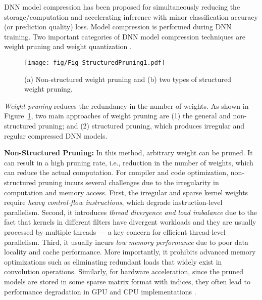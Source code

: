 \documentclass[sigplan,screen]{acmart}
\begin{document}
DNN model compression has been proposed for simultaneously reducing the storage/computation and accelerating inference with minor classification accuracy (or prediction quality) loss. Model compression is performed during DNN training. Two important categories of DNN model compression techniques are weight pruning \cite{han2015learning,guo2016dynamic,dai2017nest,mao2017exploring,wen2016learning,he2017channel} and weight quantization \cite{leng2017extremely,park2017weighted,zhou2017incremental,lin2016fixed,wu2016quantized,rastegari2016xnor,hubara2016binarized,courbariaux2015binaryconnect}.

\begin{figure}\centering
    \texttt{[image: fig/Fig\_StructuredPruning1.pdf]}
\caption{(a) Non-structured weight pruning and {(b) two types of structured weight pruning.}}
    \label{fig:structuredpruning}
\end{figure}

{\em Weight pruning} reduces the redundancy in the number of weights.
As shown in Figure~\ref{fig:structuredpruning}, 
two main approaches of weight pruning are
(1) the general and non-structured pruning; and 
(2) structured pruning, which produces
irregular and regular compressed DNN models. 


{\bf Non-Structured Pruning:}
In this method, arbitrary weight can be pruned. 
It can result in a high pruning rate, i.e., 
reduction in the number of weights, 
which can reduce the actual computation. 
For compiler and code optimization, 
non-structured pruning 
incurs several challenges 
due to the irregularity in computation and memory access.
First, the irregular and sparse kernel 
weights require
{\em heavy control-flow instructions}, which 
degrade instruction-level parallelism.
Second, it introduces 
{\em thread divergence and load imbalance} due to the fact that kernels in different filters have divergent workloads and they are usually processed by multiple threads --- a key concern for efficient thread-level parallelism.
Third, it usually incurs {\em low memory performance} due to poor data locality and cache performance.
More importantly, it prohibits advanced memory optimizations such as eliminating redundant loads that widely exist in convolution operations.  
Similarly, for hardware acceleration,
since the pruned models are stored in
some sparse matrix format with indices, 
they often 
lead to performance degradation in GPU and CPU implementations \cite{han2015learning,guo2016dynamic,dai2017nest}. 
\end{document}
